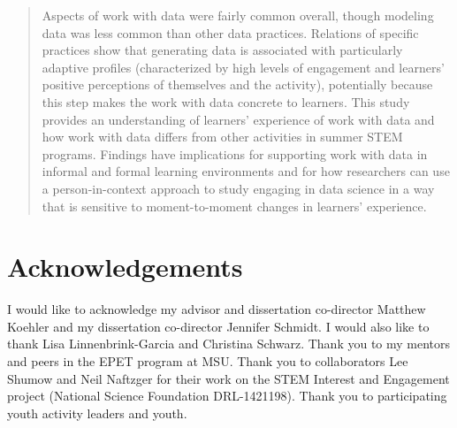 \documentclass[]{msu-thesis}
\theoremstyle{definition}
\theoremstyle{definition}
\theoremstyle{definition}
\theoremstyle{remark}
\begin{document}
\begin{abstract}
Aspects of work with data were fairly common overall, though modeling data was less common than other data practices. Relations of specific practices show that generating data is associated with particularly adaptive profiles (characterized by high levels of engagement and learners' positive perceptions of themselves and the activity), potentially because this step makes the work with data concrete to learners. This study provides an understanding of learners' experience of work with data and how work with data differs from other activities in summer STEM programs. Findings have implications for supporting work with data in informal and formal learning environments and for how researchers can use a person-in-context approach to study engaging in data science in a way that is sensitive to moment-to-moment changes in learners' experience.

\end{abstract}

\clearpage

\makecopyrightpage

%
\makededicationpage
%
\clearpage

\chapter*{Acknowledgements}
\DoubleSpacing %
I would like to acknowledge my advisor and dissertation co-director Matthew Koehler and my dissertation co-director Jennifer Schmidt. I would also like to thank Lisa Linnenbrink-Garcia and Christina Schwarz. Thank you to my mentors and peers in the EPET program at MSU. Thank you to collaborators Lee Shumow and Neil Naftzger for their work on the STEM Interest and Engagement project (National Science Foundation DRL-1421198). Thank you to participating youth activity leaders and youth.
\clearpage

\SingleSpacing
\tableofcontents* %
\clearpage
\listoftables %
\clearpage
\listoffigures %
\mainmatter
%
\end{document}
